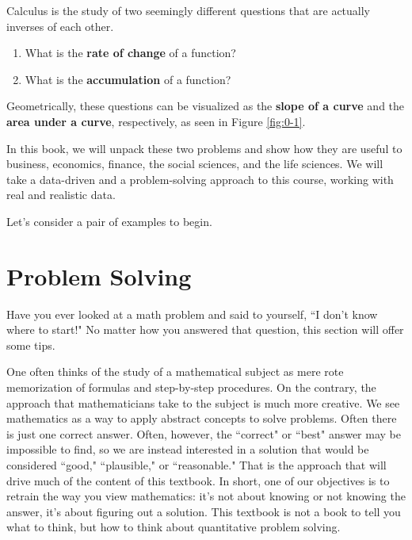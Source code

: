 Calculus is the study of two seemingly different questions that are actually inverses of each other.
\begin{enumerate}
    \item What is the {\bf rate of change} of a function?
    \item What is the {\bf accumulation} of a function?
\end{enumerate}
Geometrically, these questions can be visualized as the {\bf slope of a curve} and the {\bf area under a curve}, respectively, as seen in Figure \ref{fig:0-1}.

In this book, we will unpack these two problems and show how they are useful to business, economics, finance, the social sciences, and the life sciences. We will take a data-driven and a problem-solving approach to this course, working with real and realistic data.

Let's consider a pair of examples to begin.

\begin{example}

\end{example}

\begin{example}

\end{example}

\section{Problem Solving}
\label{sec:polya}

Have you ever looked at a math problem and said to yourself, ``I don't know where to start!" No matter how you answered that question, this section will offer some tips.

One often thinks of the study of a mathematical subject as mere rote memorization of formulas and step-by-step procedures. On the contrary, the approach that mathematicians take to the subject is much more creative. We see mathematics as a way to apply abstract concepts to solve problems. Often there is just one correct answer. Often, however, the ``correct" or ``best" answer may be impossible to find, so we are instead interested in a solution that would be considered ``good," ``plausible," or ``reasonable." That is the approach that will drive much of the content of this textbook. In short, one of our objectives is to retrain the way you view mathematics: it's not about knowing or not knowing the answer, it's about figuring out a solution. This textbook is not a book to tell you what to think, but how to think about quantitative problem solving.

